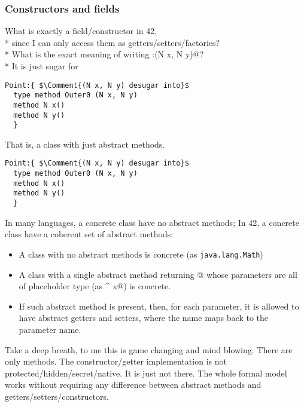 \begin{frame}[fragile]
\frametitle{Constructors and fields}

%      

\PresentationOnly\pause What is exactly a field/constructor in 42,
${}_{}$\\*
\PresentationOnly\pause since I can only
access them as getters/setters/factories?
${}_{}$\\*
\PresentationOnly\pause What is the exact meaning of writing
\Q@Point:{(N x, N y)}@?
${}_{}$\\*
\PresentationOnly\pause
It is just sugar for 
\begin{NiceCode}{59ex}{1}
\begin{lstlisting}
Point:{ $\Comment{(N x, N y) desugar into}$
  type method Outer0 (N x, N y)
  method N x()
  method N y()
  }
\end{lstlisting}
\end{NiceCode}

That is, a class with just abstract methods.
\end{frame}


\begin{frame}[fragile]
\begin{NiceCode}{59ex}{1}
\begin{lstlisting}
Point:{ $\Comment{(N x, N y) desugar into}$
  type method Outer0 (N x, N y)
  method N x()
  method N y()
  }
\end{lstlisting}
\end{NiceCode}
\PresentationOnly\pause In many languages, a concrete class have no abstract methods;
In 42, a concrete class have a \alert{coherent set} of abstract methods:
\begin{itemize}
\PresentationOnly\pause\item A class with no abstract methods is concrete {\small(as {\texttt{java.lang.Math}})}
\PresentationOnly\pause\item A class with a single abstract \Q@type@ method returning @
whose parameters are all of placeholder type (as \Q@N^ x@) is concrete.
\PresentationOnly\pause\item If such abstract \Q@type@ method is present, then, for each parameter,
it is allowed to have abstract getters and setters,
where the name maps back to the parameter name.
\end{itemize}
\PresentationOnly\pause
Take a deep breath, to me this is game changing and mind blowing.
There are only methods. The constructor/getter implementation is not
protected/hidden/secret/native. It is just \alert{not there}.
\PresentationOnly\pause The whole formal model works without requiring any difference between abstract methods
and getters/setters/constructors.

\end{frame}

